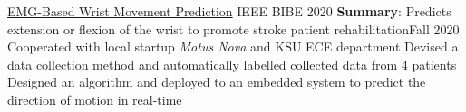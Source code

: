 \resumeSubheading
{\href{https://doi.org/10.1109/BIBE50027.2020.00172}{EMG-Based Wrist Movement
        Prediction}}
{{IEEE BIBE 2020}}
{\textbf{Summary}: Predicts extension or flexion of the wrist to promote stroke patient rehabilitation}{Fall 2020}
\resumeItemListStart
\resumeItem
{Cooperated with local startup \textit{Motus Nova} and KSU ECE department}
\resumeItem
{Devised a data collection method and automatically labelled collected data from
    4 patients}
\resumeItem
{Designed an algorithm and deployed to an embedded system to predict the direction of motion in real-time}
\resumeItemListEnd
